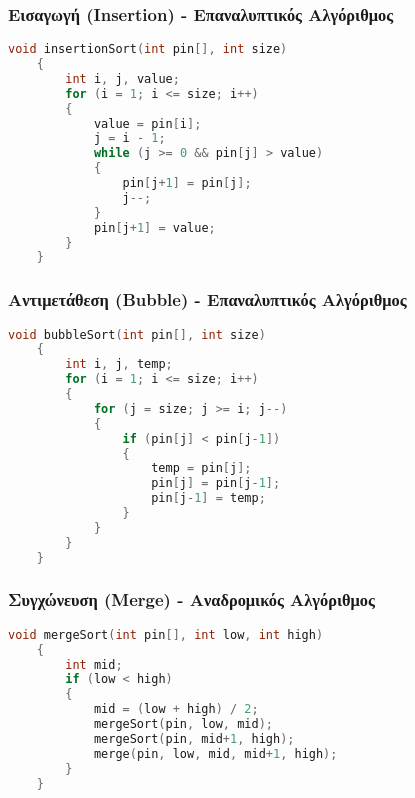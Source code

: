 \documentclass[a4paper,12pt]{article}
\begin{document}
\subsubsection{Εισαγωγή \textbf{(Insertion)} - Επαναλυπτικός Αλγόριθμος}
\begin{lstlisting}[language=c]
    void insertionSort(int pin[], int size)
    {
        int i, j, value;
        for (i = 1; i <= size; i++)
        {
            value = pin[i];
            j = i - 1;
            while (j >= 0 && pin[j] > value)
            {
                pin[j+1] = pin[j];
                j--;
            }
            pin[j+1] = value;
        }
    }
\end{lstlisting}

\newpage
\subsubsection{Αντιμετάθεση \textbf{(Bubble)} - Επαναλυπτικός Αλγόριθμος}
\begin{lstlisting}[language=c]
    void bubbleSort(int pin[], int size)
    {
        int i, j, temp;
        for (i = 1; i <= size; i++)
        {
            for (j = size; j >= i; j--)
            {
                if (pin[j] < pin[j-1])
                {
                    temp = pin[j];
                    pin[j] = pin[j-1];
                    pin[j-1] = temp;
                }
            }
        }
    }
\end{lstlisting}

\subsubsection{Συγχώνευση \textbf{(Merge)} - Αναδρομικός Αλγόριθμος}
\begin{lstlisting}[language=c]
    void mergeSort(int pin[], int low, int high)
    {
        int mid;
        if (low < high)
        {
            mid = (low + high) / 2;
            mergeSort(pin, low, mid);
            mergeSort(pin, mid+1, high);
            merge(pin, low, mid, mid+1, high);
        }
    }
\end{lstlisting}

\newpage
\end{document}
